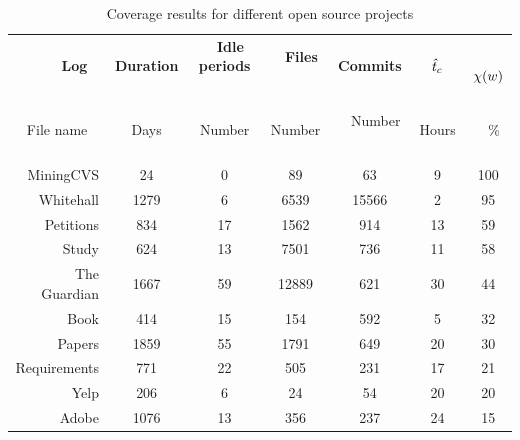 \begin{table}
\caption{Coverage results for different open source projects}
\label{tab:experiments}
\centering
\begin{tabular}{rcccccc}
\toprule
\textbf{Log} ~&~ \textbf{Duration} ~&~ \textbf{Idle periods} ~&~ \textbf{Files} ~&~	 \textbf{Commits} ~&~	\textbf{$\mathit{\hat{t}_{c}}$} ~&~ \textbf{$\chi(w)$}\\
File name ~&~ Days ~&~ Number ~&~ Number ~&~ Number ~&~ Hours ~&~ \% \\ \midrule
MiningCVS &	24 & 0 & 89  &	 63 & 9 & 100 \\

Whitehall & 1279 & 6 & 6539  &	15566 & 2 & 95 \\

Petitions &	834 & 17 & 1562  &	914 & 13 & 59 \\

Study &	624 & 13 & 7501  &	736 & 11 & 58 \\

The Guardian &	1667 & 59 & 12889  &	 621 & 30 & 44 \\

Book &	414 & 15 & 154  & 592 & 5 & 32 \\

Papers &	 1859 & 55 & 1791  &	 649 & 20 & 30 \\

Requirements & 771 & 22 & 505  &	231 & 17 & 21 \\

Yelp &	206 & 6 & 24  &	54 & 20 & 20 \\

Adobe &	1076 & 13 & 356  &	237 & 24 & 15 \\ \bottomrule

\end{tabular}%
\end{table}

